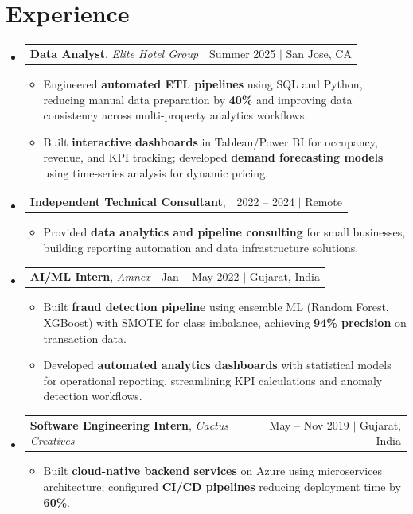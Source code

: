 \documentclass[letterpaper,10pt]{article}
\makeatletter
\newcommand{\resumeItem}[1]{
  \item\small{#1 \vspace{-3pt}}
}
\newcommand{\resumeExpHeading}[4]{
  \vspace{-3pt}\item
    \begin{tabular*}{0.97\textwidth}[t]{l@{\extracolsep{\fill}}r}
      \textbf{#1}, \textit{#3} & #2 \\
    \end{tabular*}\vspace{-8pt}
}
\newcommand{\resumeSubHeadingListStart}{\begin{itemize}[leftmargin=0.12in, label={}]}
\newcommand{\resumeSubHeadingListEnd}{\end{itemize}}
\newcommand{\resumeItemListStart}{\begin{itemize}[leftmargin=0.15in]}
\newcommand{\resumeItemListEnd}{\end{itemize}\vspace{-6pt}}
\makeatother
\begin{document}
\section{Experience}
  \resumeSubHeadingListStart

    \resumeExpHeading
      {Data Analyst}{Summer 2025 $|$ San Jose, CA}
      {Elite Hotel Group}{}
      \resumeItemListStart
        \resumeItem{Engineered \textbf{automated ETL pipelines} using SQL and Python, reducing manual data preparation by \textbf{40\%} and improving data consistency across multi-property analytics workflows.}
        \resumeItem{Built \textbf{interactive dashboards} in Tableau/Power BI for occupancy, revenue, and KPI tracking; developed \textbf{demand forecasting models} using time-series analysis for dynamic pricing.}
      \resumeItemListEnd

    \resumeExpHeading
      {Independent Technical Consultant}{2022 -- 2024 $|$ Remote}
      {}{}
      \resumeItemListStart
        \resumeItem{Provided \textbf{data analytics and pipeline consulting} for small businesses, building reporting automation and data infrastructure solutions.}
      \resumeItemListEnd

    \resumeExpHeading
      {AI/ML Intern}{Jan -- May 2022 $|$ Gujarat, India}
      {Amnex}{}
      \resumeItemListStart
        \resumeItem{Built \textbf{fraud detection pipeline} using ensemble ML (Random Forest, XGBoost) with SMOTE for class imbalance, achieving \textbf{94\% precision} on transaction data.}
        \resumeItem{Developed \textbf{automated analytics dashboards} with statistical models for operational reporting, streamlining KPI calculations and anomaly detection workflows.}
      \resumeItemListEnd

    \resumeExpHeading
      {Software Engineering Intern}{May -- Nov 2019 $|$ Gujarat, India}
      {Cactus Creatives}{}
      \resumeItemListStart
        \resumeItem{Built \textbf{cloud-native backend services} on Azure using microservices architecture; configured \textbf{CI/CD pipelines} reducing deployment time by \textbf{60\%}.}
      \resumeItemListEnd

  \resumeSubHeadingListEnd

\end{document}

